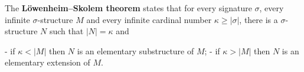 The \textbf{Löwenheim–Skolem theorem} states that for every signature $\sigma$, 
every infinite $\sigma$-structure $M$ and every infinite cardinal number $\kappa \ge |\sigma|$, 
there is a $\sigma$-structure $N$ such that $|N| = \kappa$ and

- if $\kappa < |M|$ then $N$ is an elementary substructure of $M$;
- if $\kappa > |M|$ then $N$ is an elementary extension of $M$.
